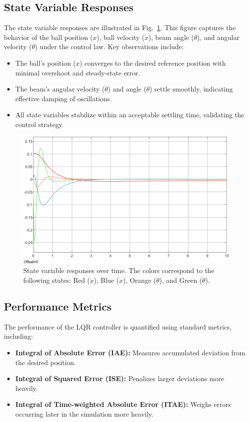 \documentclass[conference]{IEEEtran}
\begin{document}
\subsection{State Variable Responses}
The state variable responses are illustrated in Fig.~\ref{fig:states_scope}. This figure captures the behavior of the ball position (\(x\)), ball velocity (\(\dot{x}\)), beam angle (\(\theta\)), and angular velocity (\(\dot{\theta}\)) under the control law. Key observations include:

\begin{itemize}
    \item The ball's position (\(x\)) converges to the desired reference position with minimal overshoot and steady-state error.
    \item The beam's angular velocity (\(\dot{\theta}\)) and angle (\(\theta\)) settle smoothly, indicating effective damping of oscillations.
    \item All state variables stabilize within an acceptable settling time, validating the control strategy.
\end{itemize}

\begin{figure}[htbp]
    \centering
    \includegraphics[width=\linewidth]{figures/states_scope.png}
    \caption[]{State variable responses over time. The colors correspond to the following states: Red (\(x\)), Blue (\(\dot{x}\)), Orange (\(\theta\)), and Green (\(\dot{\theta}\)).}
    \label{fig:states_scope}
\end{figure}


\subsection{Performance Metrics}
The performance of the LQR controller is quantified using standard metrics, including:
\begin{itemize}
    \item \textbf{Integral of Absolute Error (IAE):} Measures accumulated deviation from the desired position.
    \item \textbf{Integral of Squared Error (ISE):} Penalizes larger deviations more heavily.
    \item \textbf{Integral of Time-weighted Absolute Error (ITAE):} Weighs errors occurring later in the simulation more heavily.
\end{itemize}
\end{document}
